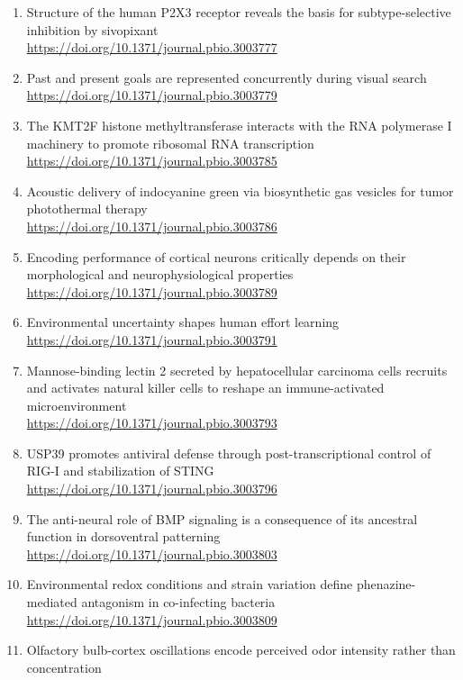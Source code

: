 \begin{enumerate}
  \item Structure of the human P2X3 receptor reveals the basis for subtype-selective inhibition by sivopixant\\
        \url{https://doi.org/10.1371/journal.pbio.3003777}
  \item Past and present goals are represented concurrently during visual search\\
        \url{https://doi.org/10.1371/journal.pbio.3003779}
  \item The KMT2F histone methyltransferase interacts with the RNA polymerase I machinery to promote ribosomal RNA transcription\\
        \url{https://doi.org/10.1371/journal.pbio.3003785}
  \item Acoustic delivery of indocyanine green via biosynthetic gas vesicles for tumor photothermal therapy\\
        \url{https://doi.org/10.1371/journal.pbio.3003786}
  \item Encoding performance of cortical neurons critically depends on their morphological and neurophysiological properties\\
        \url{https://doi.org/10.1371/journal.pbio.3003789}
  \item Environmental uncertainty shapes human effort learning\\
        \url{https://doi.org/10.1371/journal.pbio.3003791}
  \item Mannose-binding lectin 2 secreted by hepatocellular carcinoma cells recruits and activates natural killer cells to reshape an immune-activated microenvironment\\
        \url{https://doi.org/10.1371/journal.pbio.3003793}
  \item USP39 promotes antiviral defense through post-transcriptional control of RIG-I and stabilization of STING\\
        \url{https://doi.org/10.1371/journal.pbio.3003796}
  \item The anti-neural role of BMP signaling is a consequence of its ancestral function in dorsoventral patterning\\
        \url{https://doi.org/10.1371/journal.pbio.3003803}
  \item Environmental redox conditions and strain variation define phenazine-mediated antagonism in co-infecting bacteria\\
        \url{https://doi.org/10.1371/journal.pbio.3003809}
  \item Olfactory bulb-cortex oscillations encode perceived odor intensity rather than concentration\\

\end{enumerate}
